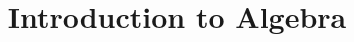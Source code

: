 \title{Introduction to Algebra}
\pretitle{\pagestyle{empty}\begin{center}  \Huge \bfseries}
	\renewcommand{\maketitlehookb}{\centering \Large  \textit{Lecture Notes in the Winter Semester 2018/19}}
\date{}
